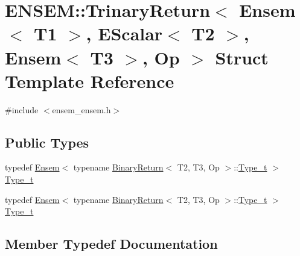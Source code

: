 \hypertarget{structENSEM_1_1TrinaryReturn_3_01Ensem_3_01T1_01_4_00_01EScalar_3_01T2_01_4_00_01Ensem_3_01T3_01_4_00_01Op_01_4}{}\section{E\+N\+S\+EM\+:\+:Trinary\+Return$<$ Ensem$<$ T1 $>$, E\+Scalar$<$ T2 $>$, Ensem$<$ T3 $>$, Op $>$ Struct Template Reference}
\label{structENSEM_1_1TrinaryReturn_3_01Ensem_3_01T1_01_4_00_01EScalar_3_01T2_01_4_00_01Ensem_3_01T3_01_4_00_01Op_01_4}


{\ttfamily \#include $<$ensem\+\_\+ensem.\+h$>$}

\subsection*{Public Types}
\begin{DoxyCompactItemize}
\item 
typedef \mbox{\hyperlink{classENSEM_1_1Ensem}{Ensem}}$<$ typename \mbox{\hyperlink{structENSEM_1_1BinaryReturn}{Binary\+Return}}$<$ T2, T3, Op $>$\+::\mbox{\hyperlink{structENSEM_1_1TrinaryReturn_3_01Ensem_3_01T1_01_4_00_01EScalar_3_01T2_01_4_00_01Ensem_3_01T3_01_4_00_01Op_01_4_a14825153e818fbe1a3b3ab066e144cc4}{Type\+\_\+t}} $>$ \mbox{\hyperlink{structENSEM_1_1TrinaryReturn_3_01Ensem_3_01T1_01_4_00_01EScalar_3_01T2_01_4_00_01Ensem_3_01T3_01_4_00_01Op_01_4_a14825153e818fbe1a3b3ab066e144cc4}{Type\+\_\+t}}
\item 
typedef \mbox{\hyperlink{classENSEM_1_1Ensem}{Ensem}}$<$ typename \mbox{\hyperlink{structENSEM_1_1BinaryReturn}{Binary\+Return}}$<$ T2, T3, Op $>$\+::\mbox{\hyperlink{structENSEM_1_1TrinaryReturn_3_01Ensem_3_01T1_01_4_00_01EScalar_3_01T2_01_4_00_01Ensem_3_01T3_01_4_00_01Op_01_4_a14825153e818fbe1a3b3ab066e144cc4}{Type\+\_\+t}} $>$ \mbox{\hyperlink{structENSEM_1_1TrinaryReturn_3_01Ensem_3_01T1_01_4_00_01EScalar_3_01T2_01_4_00_01Ensem_3_01T3_01_4_00_01Op_01_4_a14825153e818fbe1a3b3ab066e144cc4}{Type\+\_\+t}}
\end{DoxyCompactItemize}


\subsection{Member Typedef Documentation}
\mbox{\label{structENSEM_1_1TrinaryReturn_3_01Ensem_3_01T1_01_4_00_01EScalar_3_01T2_01_4_00_01Ensem_3_01T3_01_4_00_01Op_01_4_a14825153e818fbe1a3b3ab066e144cc4}} 
